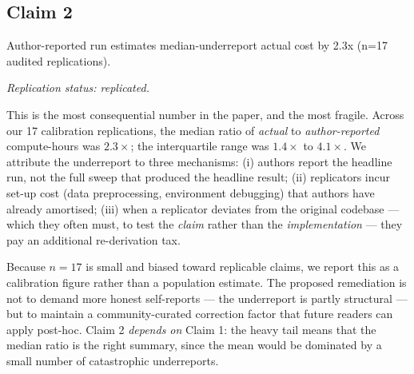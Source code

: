 \documentclass{rrxiv}
\begin{document}
\subsection*{Claim 2}
\begin{claim}[title=Claim 2, type=empirical, evidence=experiment,
              confidence=0.6,
              rationale={n=17 end-to-end calibration replications with
                IQR 1.4x to 4.1x; the sample is biased toward
                replicable claims, so this is a calibration figure
                rather than a population estimate},
              labels={reproducibility, calibration, small-n},
              datasets={rrxiv-budget-calibration-17},
              assumptions={calibration sample drawn from the
                active-replication queue and therefore biased toward
                replicable claims}]
\label{claim:c2}
Author-reported run estimates median-underreport actual cost by 2.3x (n=17 audited replications).

\emph{Replication status: replicated.}
\end{claim}

This is the most consequential number in the paper, and the most fragile. Across our 17 calibration replications, the median ratio of \emph{actual} to \emph{author-reported} compute-hours was $2.3\times$; the interquartile range was $1.4\times$ to $4.1\times$. We attribute the underreport to three mechanisms: (i) authors report the headline run, not the full sweep that produced the headline result; (ii) replicators incur set-up cost (data preprocessing, environment debugging) that authors have already amortised; (iii) when a replicator deviates from the original codebase --- which they often must, to test the \emph{claim} rather than the \emph{implementation} --- they pay an additional re-derivation tax.

Because $n=17$ is small and biased toward replicable claims, we report this as a calibration figure rather than a population estimate. The proposed remediation is not to demand more honest self-reports --- the underreport is partly structural --- but to maintain a community-curated correction factor that future readers can apply post-hoc. Claim 2 \emph{depends on} Claim 1: the heavy tail means that the median ratio is the right summary, since the mean would be dominated by a small number of catastrophic underreports.

\end{document}
